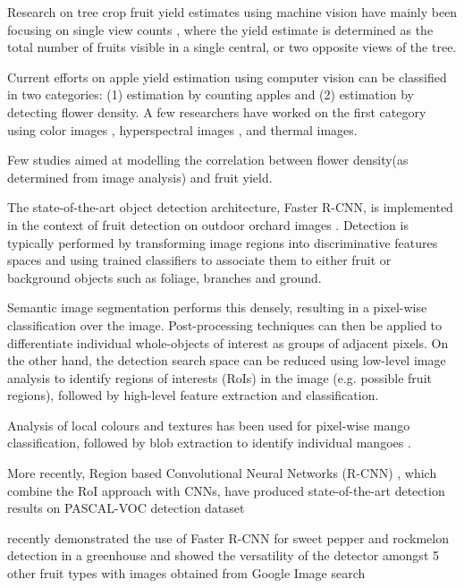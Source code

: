 \documentclass[12pt]{article}
\begin{document}
Research on tree crop fruit yield estimates using machine vision have mainly been focusing on single view counts \cite{article_payne}, where the yield estimate is determined
as the total number of fruits visible in a single central, or two opposite views of the tree.

Current efforts on apple yield estimation using computer vision can be classified in two categories: (1) estimation by counting apples and (2) estimation by detecting flower density. A few researchers have worked on the first category using color images , hyperspectral images \cite{article_safren}, and thermal images.

Few studies aimed at modelling the correlation between flower density(as determined from image analysis) and fruit yield\cite{article_Aggelopoulou}.

The state-of-the-art object detection architecture, Faster R-CNN, is implemented in the context of fruit detection on
outdoor orchard images \cite{7989417_Bargoti}.  Detection is typically performed by transforming
image regions into discriminative features spaces and using
trained classifiers to associate them to either fruit or background objects such as foliage, branches and ground.

Semantic image segmentation performs this densely, resulting
in a pixel-wise classification over the image. Post-processing
techniques can then be applied to differentiate individual
whole-objects of interest as groups of adjacent pixels. On
the other hand, the detection search space can be reduced
using low-level image analysis to identify regions of interests
(RoIs) in the image (e.g. possible fruit regions), followed by
high-level feature extraction and classification.

Analysis of local colours and textures has been used for
pixel-wise mango classification, followed by blob extraction
to identify individual mangoes \cite{PAYNE2014160}.

More recently, Region based Convolutional Neural Networks (R-CNN) \cite{7112511_Girshick}, which combine the RoI approach
with CNNs, have produced state-of-the-art detection results
on PASCAL-VOC detection dataset \cite{everingham2010pascal}

\cite{sa2016deepfruits} recently demonstrated the use
of Faster R-CNN for sweet pepper and rockmelon detection
in a greenhouse and showed the versatility of the detector
amongst 5 other fruit types with images obtained from
Google Image search
\end{document}
